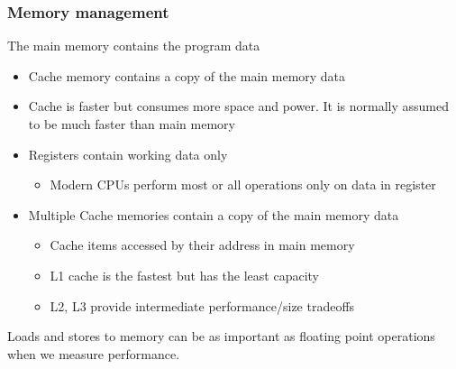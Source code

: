 \documentclass{beamer}
\begin{document}
\begin{frame}
\frametitle{Memory management}

The main memory contains the program data
\begin{itemize}
\item Cache memory contains a copy of the main memory data

\item Cache is faster but consumes more space and power. It is normally assumed to be much faster than main memory

\item Registers contain working data only
\begin{itemize}

 \item Modern CPUs perform most or all operations only on data in register

\end{itemize}

\noindent
\item Multiple Cache memories contain a copy of the main memory data
\begin{itemize}

 \item Cache items accessed by their address in main memory

 \item L1 cache is the fastest but has the least capacity

 \item L2, L3 provide intermediate performance/size tradeoffs
\end{itemize}

\noindent
\end{itemize}

\noindent
Loads and stores to memory can be as important as floating point operations when we measure performance.
\end{frame}
\end{document}
